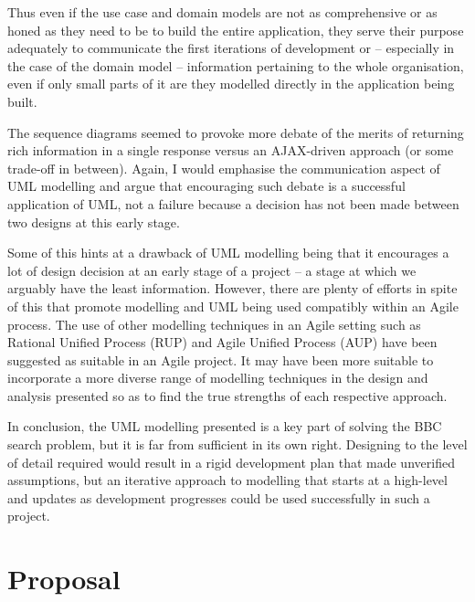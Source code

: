 \documentclass[oribibl]{llncs}
\begin{document}
Thus even if the use case and domain models are not as comprehensive or
as honed as they need to be to build the entire application, they serve
their purpose adequately to communicate the first iterations of
development or -- especially in the case of the domain model -- information
pertaining to the whole organisation, even if only small parts of it are
they modelled directly in the application being built.

The sequence diagrams seemed to provoke more debate of the merits of
returning rich information in a single response versus an AJAX-driven
approach (or some trade-off in between). Again, I would emphasise the
communication aspect of UML modelling and argue that encouraging such debate
is a successful application of UML, not a failure because a decision
has not been made between two designs at this early stage.

Some of this hints at a drawback of UML modelling being that it encourages
a lot of design decision at an early stage of a project -- a stage at which we arguably
have the least information. \citep{kelly2013conway} However, there are plenty of
efforts in spite of this that promote modelling and UML being used
compatibly within an Agile process. The use of other modelling techniques
in an Agile setting such as
Rational Unified Process (RUP) and Agile Unified Process (AUP) have been
suggested as suitable in an Agile project.
\citep{ambler2002agile} It may have been more suitable to incorporate
a more diverse range of modelling techniques in the design and analysis
presented so as to find the true strengths of each respective approach.

In conclusion, the UML modelling presented is a key part of solving
the BBC search problem, but it is far from sufficient in its own right.
Designing to the level of detail required would result in a rigid
development plan that made unverified assumptions, but an iterative
approach to modelling that starts at a high-level and updates as
development progresses could be used successfully in such a project.

\appendix
\section{Proposal}





\end{document}
